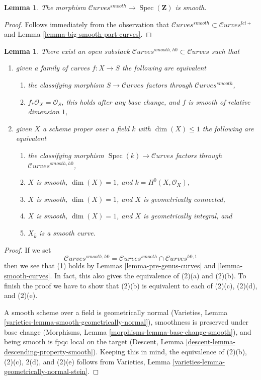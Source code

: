 \documentclass{stacks-project}
\theoremstyle{plain}
\newtheorem{lemma}[subsection]{Lemma}
\theoremstyle{definition}
\theoremstyle{remark}
\numberwithin{equation}{subsection}
\def\Spec{\mathop{\mathrm{Spec}}}
\def\Curvesstack{\mathcal{C}\!\mathit{urves}}
\begin{document}
\begin{lemma}
\label{lemma-smooth-curves-smooth}
The morphism $\Curvesstack^{smooth} \to \Spec(\mathbf{Z})$ is smooth.
\end{lemma}

\begin{proof}
Follows immediately from the observation that
$\Curvesstack^{smooth} \subset \Curvesstack^{lci+}$
and Lemma \ref{lemma-big-smooth-part-curves}.
\end{proof}

\begin{lemma}
\label{lemma-smooth-curves-h0}
There exist an open substack
$\Curvesstack^{smooth, h0} \subset \Curvesstack$
such that
\begin{enumerate}
\item given a family of curves $f : X \to S$ the following are equivalent
\begin{enumerate}
\item the classifying morphism $S \to \Curvesstack$ factors
through $\Curvesstack^{smooth}$,
\item $f_*\mathcal{O}_X = \mathcal{O}_S$, this holds after any base change,
and $f$ is smooth of relative dimension $1$,
\end{enumerate}
\item given $X$ a scheme proper over a field $k$ with
$\dim(X) \leq 1$ the following are equivalent
\begin{enumerate}
\item the classifying morphism $\Spec(k) \to \Curvesstack$
factors through $\Curvesstack^{smooth, h0}$,
\item $X$ is smooth, $\dim(X) = 1$, and $k = H^0(X, \mathcal{O}_X)$,
\item $X$ is smooth, $\dim(X) = 1$, and $X$ is geometrically connected,
\item $X$ is smooth, $\dim(X) = 1$, and $X$ is geometrically integral, and
\item $X_{\overline{k}}$ is a smooth curve.
\end{enumerate}
\end{enumerate}
\end{lemma}

\begin{proof}
If we set
$$
\Curvesstack^{smooth, h0} = \Curvesstack^{smooth} \cap
\Curvesstack^{h0, 1}
$$
then we see that (1) holds by
Lemmas \ref{lemma-pre-genus-curves} and \ref{lemma-smooth-curves}.
In fact, this also gives the equivalence of (2)(a) and (2)(b).
To finish the proof we have to show that
(2)(b) is equivalent to each of (2)(c), (2)(d), and (2)(e).

\medskip\noindent
A smooth scheme over a field is geometrically normal
(Varieties, Lemma \ref{varieties-lemma-smooth-geometrically-normal}),
smoothness is preserved under base change
(Morphisms, Lemma \ref{morphisms-lemma-base-change-smooth}), and
being smooth is fpqc local on the target
(Descent, Lemma \ref{descent-lemma-descending-property-smooth}).
Keeping this in mind, the equivalence of (2)(b), (2)(c), 2(d), and (2)(e)
follows from Varieties, Lemma \ref{varieties-lemma-geometrically-normal-stein}.
\end{proof}
\end{document}
